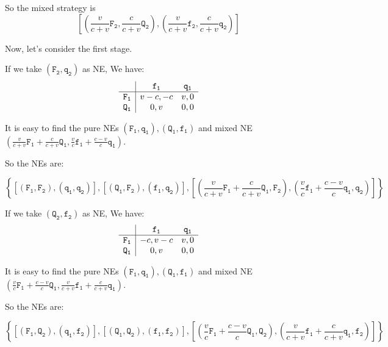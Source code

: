 \documentclass{article}
\begin{document}
    So the mixed strategy is
    $$
    \left[\left(\frac{v}{c+v}\mathtt{F_2}, \frac{c}{c+v}\mathtt{Q_2}\right), \left(\frac{v}{c+v}\mathtt{f_2}, \frac{c}{c+v}\mathtt{q_2}\right)\right]
    $$

    Now, let's consider the first stage.
    
    If we take $(\mathtt{F_2}, \mathtt{q_2})$ as NE, We have:
    $$
    \begin{array}{c|c c}
    & \mathtt{f_1} & \mathtt{q_1} \\\hline
    \mathtt{F_1} & v-c, -c & v, 0\\
    \mathtt{Q_1} & 0, v & 0, 0
    \end{array}
    $$

    It is easy to find the pure NEs $(\mathtt{F_1}, \mathtt{q_1}), (\mathtt{Q_1}, \mathtt{f_1})$ and mixed NE $\left(\frac{v}{c+v}\mathtt{F_1}+\frac{c}{c+v}\mathtt{Q_1}, \frac{v}{c}\mathtt{f_1}+\frac{c-v}{c}\mathtt{q_1}\right)$.

    So the NEs are:

    $$
    \left\{\left[\left(\mathtt{F_1}, \mathtt{F_2}\right), \left(\mathtt{q_1}, \mathtt{q_2}\right)\right], \left[\left(\mathtt{Q_1}, \mathtt{F_2}\right), \left(\mathtt{f_1}, \mathtt{q_2}\right)\right], \left[\left(\frac{v}{c+v}\mathtt{F_1}+\frac{c}{c+v}\mathtt{Q_1}, \mathtt{F_2}\right), \left(\frac{v}{c}\mathtt{f_1}+\frac{c-v}{c}\mathtt{q_1}, \mathtt{q_2}\right)\right]\right\}
    $$

    If we take $(\mathtt{Q_2}, \mathtt{f_2})$ as NE, We have:
    $$
    \begin{array}{c|c c}
    & \mathtt{f_1} & \mathtt{q_1} \\\hline
    \mathtt{F_1} & -c, v-c & v, 0\\
    \mathtt{Q_1} & 0, v & 0, 0
    \end{array}
    $$

    It is easy to find the pure NEs $(\mathtt{F_1}, \mathtt{q_1}), (\mathtt{Q_1}, \mathtt{f_1})$ and mixed NE $\left(\frac{v}{c}\mathtt{F_1}+\frac{c-v}{c}\mathtt{Q_1}, \frac{v}{c+v}\mathtt{f_1}+\frac{c}{c+v}\mathtt{q_1}\right)$.

    So the NEs are:

    $$
    \left\{
    \left[\left(\mathtt{F_1}, \mathtt{Q_2}\right),\left(\mathtt{q_1}, \mathtt{f_2}\right)\right], \left[\left(\mathtt{Q_1}, \mathtt{Q_2}\right), \left(\mathtt{f_1}, \mathtt{f_2}\right)\right], 
    \left[\left(\frac{v}{c}\mathtt{F_1}+\frac{c-v}{c}\mathtt{Q_1}, \mathtt{Q_2}\right), \left(\frac{v}{c+v}\mathtt{f_1}+\frac{c}{c+v}\mathtt{q_1}, \mathtt{f_2}\right)\right]\right\}
    $$
\end{document}
